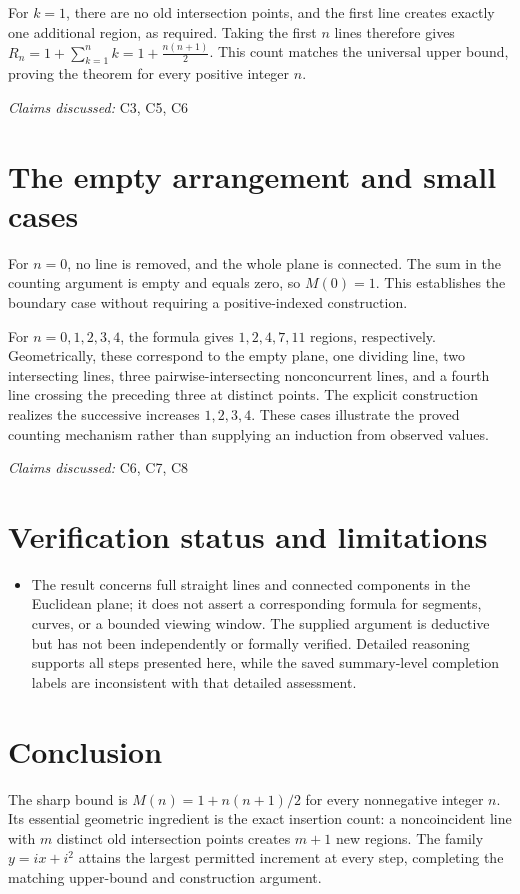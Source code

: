 \documentclass[11pt]{article}
\begin{document}
For $k=1$, there are no old intersection points, and the first line creates exactly one additional region, as required. Taking the first $n$ lines therefore gives
$R_n=1+\sum_{k=1}^{n}k=1+\frac{n(n+1)}{2}$. This count matches the universal upper bound, proving the theorem for every positive integer $n$.

\textit{Claims discussed: }C3, C5, C6
\section{The empty arrangement and small cases}
For $n=0$, no line is removed, and the whole plane is connected. The sum in the counting argument is empty and equals zero, so $M(0)=1$. This establishes the boundary case without requiring a positive-indexed construction.

For $n=0,1,2,3,4$, the formula gives $1,2,4,7,11$ regions, respectively. Geometrically, these correspond to the empty plane, one dividing line, two intersecting lines, three pairwise-intersecting nonconcurrent lines, and a fourth line crossing the preceding three at distinct points. The explicit construction realizes the successive increases $1,2,3,4$. These cases illustrate the proved counting mechanism rather than supplying an induction from observed values.

\textit{Claims discussed: }C6, C7, C8
\section{Verification status and limitations}
\begin{itemize}
\item The result concerns full straight lines and connected components in the Euclidean plane; it does not assert a corresponding formula for segments, curves, or a bounded viewing window. The supplied argument is deductive but has not been independently or formally verified. Detailed reasoning supports all steps presented here, while the saved summary-level completion labels are inconsistent with that detailed assessment.
\end{itemize}
\section{Conclusion}
The sharp bound is $M(n)=1+n(n+1)/2$ for every nonnegative integer $n$. Its essential geometric ingredient is the exact insertion count: a noncoincident line with $m$ distinct old intersection points creates $m+1$ new regions. The family $y=ix+i^2$ attains the largest permitted increment at every step, completing the matching upper-bound and construction argument.
\end{document}
